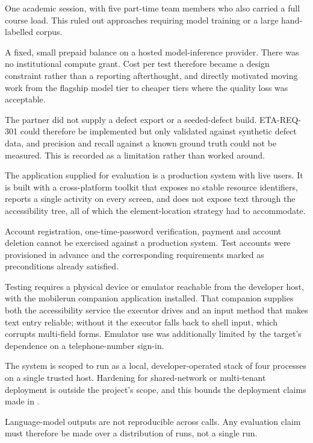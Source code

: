 \begin{description}[leftmargin=2.6em,style=nextline]
  \item[C1. Time.] One academic session, with five part-time team members who
    also carried a full course load. This ruled out approaches requiring model
    training or a large hand-labelled corpus.
  \item[C2. Budget.] A fixed, small prepaid balance on a hosted
    model-inference provider. There was no institutional compute grant. Cost per
    test therefore became a design constraint rather than a reporting
    afterthought, and directly motivated moving work from the flagship model
    tier to cheaper tiers where the quality loss was acceptable.
  \item[C3. Data availability.] The partner did not supply a defect export or
    a seeded-defect build. ETA-REQ-301 could therefore be implemented but only
    validated against synthetic defect data, and precision and recall against a
    known ground truth could not be measured. This is recorded as a limitation
    rather than worked around.
  \item[C4. Target application.] The application supplied for evaluation is a
    production system with live users. It is built with a cross-platform toolkit
    that exposes no stable resource identifiers, reports a single activity on
    every screen, and does not expose text through the accessibility tree, all of which the element-location strategy had to accommodate.
  \item[C5. Irreversible flows.] Account registration, one-time-password
    verification, payment and account deletion cannot be exercised against a
    production system. Test accounts were provisioned in advance and the
    corresponding requirements marked as preconditions already satisfied.
  \item[C6. Device access.] Testing requires a physical device or emulator reachable from the developer host, with the mobilerun companion application installed. That companion supplies both the accessibility service the executor drives and an input method that makes text entry reliable; without it the executor falls back to shell input, which corrupts multi-field forms. Emulator use was additionally limited by the target's
    dependence on a telephone-number sign-in.
  \item[C7. Deployment.] The system is scoped to run as a local, developer-operated stack of four processes on a single trusted host. Hardening for shared-network or multi-tenant deployment is outside the project's scope, and this bounds the deployment claims made in .
  \item[C8. Non-determinism.] Language-model outputs are not reproducible
    across calls. Any evaluation claim must therefore be made over a
    distribution of runs, not a single run.
\end{description}

